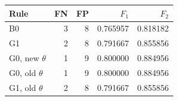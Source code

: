\begin{tabular}{lrrrr}
\toprule
Rule & FN & FP & $F_1$ & $F_2$ \\
\midrule
B0 & 3 & 8 & 0.765957 & 0.818182 \\
G1 & 2 & 8 & 0.791667 & 0.855856 \\
G0, new $\theta$ & 1 & 9 & 0.800000 & 0.884956 \\
G0, old $\theta$ & 1 & 9 & 0.800000 & 0.884956 \\
G1, old $\theta$ & 2 & 8 & 0.791667 & 0.855856 \\
\bottomrule
\end{tabular}
